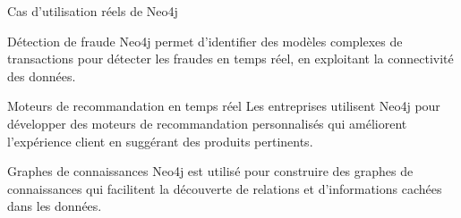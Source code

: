 \begin{frame}{Cas d'utilisation réels de Neo4j}
  \begin{block}{Détection de fraude}
    Neo4j permet d'identifier des modèles complexes de transactions pour détecter les fraudes en temps réel, en exploitant la connectivité des données.
  \end{block}
  \begin{block}{Moteurs de recommandation en temps réel}
    Les entreprises utilisent Neo4j pour développer des moteurs de recommandation personnalisés qui améliorent l'expérience client en suggérant des produits pertinents.
  \end{block}
  \begin{block}{Graphes de connaissances}
    Neo4j est utilisé pour construire des graphes de connaissances qui facilitent la découverte de relations et d'informations cachées dans les données.
  \end{block}
\end{frame}